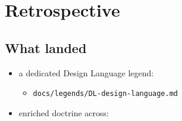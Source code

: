 \section{Retrospective}\label{record-168-retrospective}

\subsection{What landed}\label{record-168-what-landed}

\begin{itemize}
\tightlist
\item
  a dedicated Design Language legend:

  \begin{itemize}
  \tightlist
  \item
    \texttt{d\allowbreak{}o\allowbreak{}c\allowbreak{}s\allowbreak{}/\allowbreak{}l\allowbreak{}e\allowbreak{}g\allowbreak{}e\allowbreak{}n\allowbreak{}d\allowbreak{}s\allowbreak{}/\allowbreak{}D\allowbreak{}L\allowbreak{}-\allowbreak{}d\allowbreak{}e\allowbreak{}s\allowbreak{}i\allowbreak{}g\allowbreak{}n\allowbreak{}-\allowbreak{}l\allowbreak{}a\allowbreak{}n\allowbreak{}g\allowbreak{}u\allowbreak{}a\allowbreak{}g\allowbreak{}e\allowbreak{}.\allowbreak{}m\allowbreak{}d}
  \end{itemize}
\item
  enriched doctrine across:


\end{itemize}
